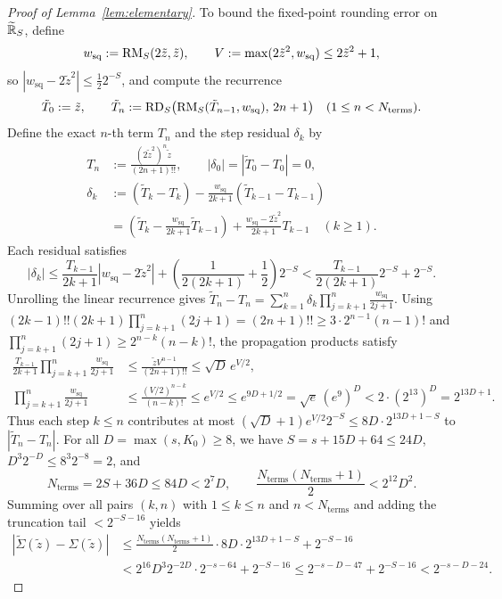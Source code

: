 \begin{proof}[Proof of Lemma~\ref{lem:elementary}]
To bound the fixed-point rounding error on $\widetilde{\mathbb{R}}_S$, define
\[
  w_{\mathrm{sq}} := \operatorname{RM}_S(2\tilde{z}, \tilde{z}), \qquad V := \max(2\tilde{z}^2, w_{\mathrm{sq}}) \le 2\tilde{z}^2 + 1,
\]
so $|w_{\mathrm{sq}} - 2\tilde{z}^2| \le \frac{1}{2}2^{-S}$, and compute the recurrence
\[
  \tilde{T}_0 := \tilde{z}, \qquad \tilde{T}_n := \operatorname{RD}_S\bigl(\operatorname{RM}_S(\tilde{T}_{n-1}, w_{\mathrm{sq}}),\, 2n+1\bigr) \quad (1 \le n < N_{\mathrm{terms}}).
\]
Define the exact $n$-th term $T_n$ and the step residual $\delta_k$ by
\begin{align*}
  T_n &:= \frac{(2\tilde{z}^2)^n \tilde{z}}{(2n+1)!!}, \qquad |\delta_0| = |\tilde{T}_0 - T_0| = 0, \\
  \delta_k &:= (\tilde{T}_k - T_k) - \frac{w_{\mathrm{sq}}}{2k+1}(\tilde{T}_{k-1} - T_{k-1}) \\
           &= \left(\tilde{T}_k - \frac{w_{\mathrm{sq}}}{2k+1}\tilde{T}_{k-1}\right) + \frac{w_{\mathrm{sq}} - 2\tilde{z}^2}{2k+1}T_{k-1} \quad (k \ge 1).
\end{align*}
Each residual satisfies
\[
  |\delta_k| \le \frac{T_{k-1}}{2k+1}|w_{\mathrm{sq}} - 2\tilde{z}^2| + \left(\frac{1}{2(2k+1)} + \frac{1}{2}\right)2^{-S} < \frac{T_{k-1}}{2(2k+1)} 2^{-S} + 2^{-S}.
\]
Unrolling the linear recurrence gives $\tilde{T}_n - T_n = \sum_{k=1}^n \delta_k \prod_{j=k+1}^n \frac{w_{\mathrm{sq}}}{2j+1}$. Using $(2k-1)!!(2k+1)\prod_{j=k+1}^n(2j+1) = (2n+1)!! \ge 3\cdot 2^{n-1}(n-1)!$ and $\prod_{j=k+1}^n(2j+1) \ge 2^{n-k}(n-k)!$, the propagation products satisfy
\begin{align*}
  \frac{T_{k-1}}{2k+1}\prod_{j=k+1}^n \frac{w_{\mathrm{sq}}}{2j+1} &\le \frac{\tilde{z} V^{n-1}}{(2n+1)!!} \le \sqrt{D}\,e^{V/2}, \\
  \prod_{j=k+1}^n \frac{w_{\mathrm{sq}}}{2j+1} &\le \frac{(V/2)^{n-k}}{(n-k)!} \le e^{V/2} \le e^{9D + 1/2} = \sqrt{e}\,(e^9)^D < 2 \cdot (2^{13})^D = 2^{13D + 1}.
\end{align*}
Thus each step $k \le n$ contributes at most $(\sqrt{D} + 1)e^{V/2} 2^{-S} \le 8D \cdot 2^{13D + 1 - S}$ to $|\tilde{T}_n - T_n|$. For all $D = \max(s, K_0) \ge 8$, we have $S = s + 15D + 64 \le 24D$, $D^3 2^{-D} \le 8^3 2^{-8} = 2$, and
\[
  N_{\mathrm{terms}} = 2S + 36D \le 84D < 2^7 D, \qquad \frac{N_{\mathrm{terms}}(N_{\mathrm{terms}}+1)}{2} < 2^{12} D^2.
\]
Summing over all pairs $(k, n)$ with $1 \le k \le n$ and $n < N_{\mathrm{terms}}$ and adding the truncation tail $< 2^{-S-16}$ yields
\begin{align*}
  |\widetilde{\Sigma}(\tilde{z}) - \Sigma(\tilde{z})| &\le \frac{N_{\mathrm{terms}}(N_{\mathrm{terms}}+1)}{2} \cdot 8D \cdot 2^{13D + 1 - S} + 2^{-S-16} \\
  &< 2^{16} D^3 2^{-2D} \cdot 2^{-s-64} + 2^{-S-16} \le 2^{-s-D-47} + 2^{-S-16} < 2^{-s-D-24}.
\end{align*}


\end{proof}
